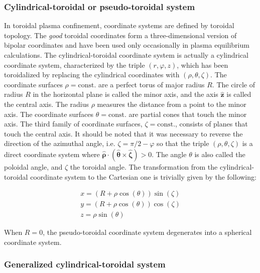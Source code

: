 \subsubsection{Cylindrical-toroidal or pseudo-toroidal system}

In toroidal plasma confinement, coordinate systems are defined by toroidal topology. The \textit{good} toroidal coordinates form a three-dimensional version of bipolar coordinates and have been used only occasionally in plasma equilibrium calculations. The cylindrical-toroidal coordinate system is actually a cylindrical coordinate system, characterized by the triple $(r, \varphi, z)$, which has been toroidalized by replacing the cylindrical coordinates with $(\rho, \theta, \zeta)$. The coordinate surfaces $\rho=\text{const.}$ are a perfect torus of major radius $R$. The circle of radius $R$ in the horizontal plane is called the minor axis, and the axis $\mathbf{\hat{z}}$ is called the central axis. The radius $\rho$ measures the distance from a point to the minor axis. The coordinate surfaces $\theta=\text{const.}$ are partial cones that touch the minor axis. The third family of coordinate surfaces, $\zeta=\text{const.}$, consists of planes that touch the central axis. It should be noted that it was necessary to reverse the direction of the azimuthal angle, i.e. $\zeta=\pi/2-\varphi$ so that the triple $(\rho, \theta, \zeta)$ is a direct coordinate system where $\boldsymbol{\hat{\rho}}\cdot(\boldsymbol{\hat{\theta}}\times\boldsymbol{\hat{\zeta}})>0$. The angle $\theta$ is also called the poloidal angle, and $\zeta$ the toroidal angle. The transformation from the cylindrical-toroidal coordinate system to the Cartesian one is trivially given by the following:

\vspace*{-12pt}

\begin{gather}
    x=(R+\rho\cos(\theta))\sin(\zeta)\\
    y=(R+\rho\cos(\theta))\cos(\zeta)\\
    z=\rho\sin(\theta)
\end{gather}

\vspace*{-2pt}

When $R=0$, the pseudo-toroidal coordinate system degenerates into a spherical coordinate system.

\subsubsection{Generalized cylindrical-toroidal system}

